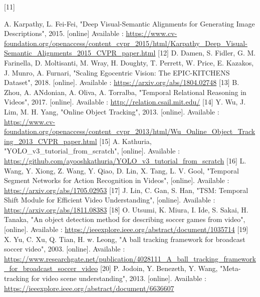\documentclass{article}
\begin{document}
\newline
\hypertarget{ref11}{[11]}  A. Karpathy, L. Fei-Fei, "Deep Visual-Semantic Alignments for Generating Image Descriptions", 2015. [online] Available : \url{https://www.cv-foundation.org/openaccess/content_cvpr_2015/html/Karpathy_Deep_Visual-Semantic_Alignments_2015_CVPR_paper.html}
\newline
\hypertarget{ref12}{[12]}  D. Damen, S. Fidler, G. M. Farinella, D. Moltisanti, M. Wray, H. Doughty, T. Perrett, W. Price, E. Kazakos, J. Munro, A. Furnari, "Scaling Egocentric Vision: The EPIC-KITCHENS Dataset", 2018. [online]. Available :  \url{https://arxiv.org/abs/1804.02748}
\newline
\hypertarget{ref13}{[13]} B. Zhou, A. ANdonian, A. Oliva, A. Torralba, "Temporal Relational Reasoning in Videos", 2017. [online]. Available :  \url{http://relation.csail.mit.edu/}
\newline
\hypertarget{ref14}{[14]} Y. Wu, J. Lim, M. H. Yang, "Online Object Tracking", 2013. [online]. Available :  \url{https://www.cv-foundation.org/openaccess/content_cvpr_2013/html/Wu_Online_Object_Tracking_2013_CVPR_paper.html}
\newline
\hypertarget{ref15}{[15]} A. Kathuria, "YOLO\_v3\_tutorial\_from\_scratch", [online]. Available :  \url{https://github.com/ayooshkathuria/YOLO_v3_tutorial_from_scratch}
\newline
\hypertarget{ref16}{[16]} L. Wang, Y. Xiong, Z. Wang, Y. Qiao, D. Lin, X. Tang, L. V. Gool, "Temporal Segment Networks for Action Recognition in Videos", [online]. Available :  \url{https://arxiv.org/abs/1705.02953}
\newline
\hypertarget{ref17}{[17]} J. Lin, C. Gan, S. Han, "TSM: Temporal Shift Module for Efficient Video Understanding", [online]. Available :  \url{https://arxiv.org/abs/1811.08383}
\newline
\hypertarget{ref18}{[18]} O. Utsumi, K. Miura, I. Ide, S. Sakai, H. Tanaka, "An object detection method for describing soccer games from video", [online]. Available :  \url{https://ieeexplore.ieee.org/abstract/document/1035714}
\newline
\hypertarget{ref19}{[19]} X. Yu, C. Xu, Q. Tian, H. w. Leong, "A ball tracking framework for broadcast soccer video", 2003. [online]. Available :  \url{https://www.researchgate.net/publication/4028111_A_ball_tracking_framework_for_broadcast_soccer_video}
\newline
\hypertarget{ref20}{[20]} P. Jodoin, Y. Benezeth, Y. Wang, "Meta-tracking for video scene understanding", 2013. [online]. Available :  \url{https://ieeexplore.ieee.org/abstract/document/6636607}
\end{document}
